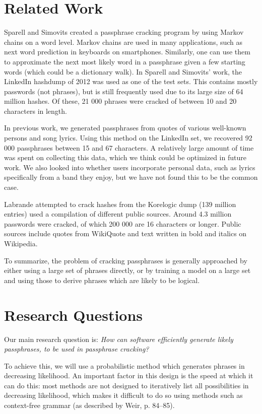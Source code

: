 \documentclass{article}
\begin{document}
\section{Related Work}

Sparell and Simovits\cite{sparell-simovits} created a passphrase cracking
program by using Markov chains on a word level. Markov chains are used in many
applications, such as next word prediction in keyboards on smartphones.
Similarly, one can use them to approximate the next most likely word in a
passphrase given a few starting words (which could be a dictionary walk). In
Sparell and Simovits' work, the LinkedIn hashdump of 2012 was used as one of
the test sets. This contains mostly passwords (not phrases), but is still
frequently used due to its large size of 64 million hashes. Of these, 21 000
phrases were cracked of between 10 and 20 characters in length.

In previous work, we\cite{own} generated passphrases from quotes of various
well-known persons and song lyrics. Using this method on the LinkedIn set, we
recovered 92 000 passphrases between 15 and 67 characters. A relatively large
amount of time was spent on collecting this data, which we think could be
optimized in future work. We also looked into whether users incorporate
personal data, such as lyrics specifically from a band they enjoy, but we have
not found this to be the common case.

Labrande\cite{crackmeimfamous} attempted to crack hashes from the Korelogic
dump (139 million entries) used a compilation of different public sources.
Around 4.3 million passwords were cracked, of which 200 000 are 16 characters
or longer. Public sources include quotes from WikiQuote and text written in
bold and italics on Wikipedia.

To summarize, the problem of cracking passphrases is generally approached by
either using a large set of phrases directly, or by training a model on a large
set and using those to derive phrases which are likely to be logical.


\section{Research Questions}

Our main research question is: {\it How can software efficiently generate
likely passphrases, to be used in passphrase cracking?}

To achieve this, we will use a probabilistic method which generates phrases in
decreasing likelihood. An important factor in this design is the speed at which
it can do this: most methods are not designed to iteratively list all
possibilities in decreasing likelihood, which makes it difficult to do so using
methods such as context-free grammar (as described by
Weir\cite{probabilistic-thesis}, p. 84--85).
\end{document}
